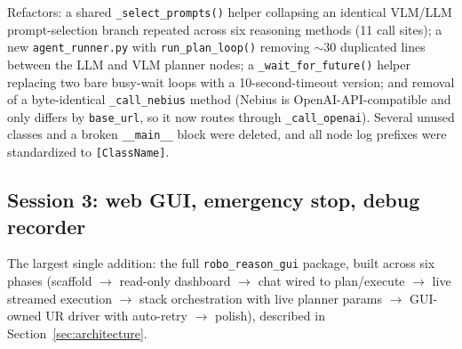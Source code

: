 Refactors: a shared \texttt{\_select\_prompts()} helper collapsing an
identical VLM/LLM prompt-selection branch repeated across six reasoning
methods (11 call sites); a new \texttt{agent\_runner.py} with
\texttt{run\_plan\_loop()} removing $\sim$30 duplicated lines between the LLM
and VLM planner nodes; a \texttt{\_wait\_for\_future()} helper replacing two
bare busy-wait loops with a 10-second-timeout version; and removal of a
byte-identical \texttt{\_call\_nebius} method (Nebius is OpenAI-API-compatible
and only differs by \texttt{base\_url}, so it now routes through
\texttt{\_call\_openai}). Several unused classes and a broken \texttt{\_\_main\_\_}
block were deleted, and all node log prefixes were standardized to
\texttt{[ClassName]}.

\subsection{Session 3: web GUI, emergency stop, debug recorder}

The largest single addition: the full \texttt{robo\_reason\_gui} package,
built across six phases (scaffold $\to$ read-only dashboard $\to$ chat wired
to plan/execute $\to$ live streamed execution $\to$ stack orchestration with
live planner params $\to$ GUI-owned UR driver with auto-retry $\to$ polish),
described in Section~\ref{sec:architecture}.

